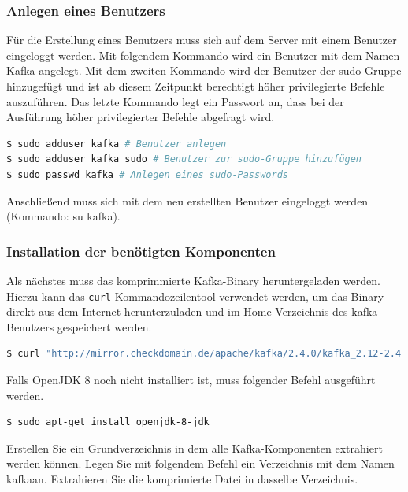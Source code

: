 \documentclass[a4paper,titlepage,halfparskip,12pt]{scrreprt}
\begin{document}
\begin{onehalfspacing}
\subsubsection*{Anlegen eines Benutzers}

Für die Erstellung eines Benutzers muss sich auf dem Server mit einem Benutzer eingeloggt werden. Mit folgendem Kommando wird ein Benutzer mit dem Namen Kafka angelegt. Mit dem zweiten Kommando wird der Benutzer der \glqq sudo\grqq -Gruppe hinzugefügt und ist ab diesem Zeitpunkt berechtigt höher privilegierte Befehle auszuführen. Das letzte Kommando legt ein Passwort an, dass bei der Ausführung höher privilegierter Befehle abgefragt wird.

\smallskip

\begin{lstlisting}[language=Bash]
$ sudo adduser kafka # Benutzer anlegen
$ sudo adduser kafka sudo # Benutzer zur sudo-Gruppe hinzufügen
$ sudo passwd kafka # Anlegen eines sudo-Passwords
\end{lstlisting}

Anschließend muss sich mit dem neu erstellten Benutzer eingeloggt werden (Kommando: su kafka).

\subsubsection*{Installation der benötigten Komponenten}


Als nächstes muss das komprimmierte Kafka-Binary heruntergeladen werden. Hierzu kann das \texttt{curl}-Kommandozeilentool verwendet werden, um das Binary direkt aus dem Internet herunterzuladen und im Home-Verzeichnis des kafka-Benutzers gespeichert werden.

\smallskip

\begin{lstlisting}[language=Bash]
$ curl "http://mirror.checkdomain.de/apache/kafka/2.4.0/kafka_2.12-2.4.0.tgz" -o ~/kafka_2.12-2.4.0.tgz
\end{lstlisting}

Falls OpenJDK 8 noch nicht installiert ist, muss folgender Befehl ausgeführt werden.

\smallskip

\begin{lstlisting}[language=Bash]
$ sudo apt-get install openjdk-8-jdk
\end{lstlisting}

Erstellen Sie ein Grundverzeichnis in dem alle Kafka-Komponenten extrahiert werden können. Legen Sie mit folgendem Befehl ein Verzeichnis mit dem Namen \glqq kafka\grqq an. Extrahieren Sie die komprimierte Datei in dasselbe Verzeichnis.


\end{onehalfspacing}
\end{document}
